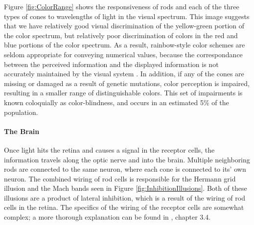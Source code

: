 \documentclass[11pt]{isuthesis}
\begin{document}
Figure \ref{fig:ColorRange} shows the responsiveness of rods and each of the three types of cones to wavelengths of light in the visual spectrum. This image suggests that we have relatively good visual discrimination of the yellow-green portion of the color spectrum, but relatively poor discrimination of colors in the red and blue portions of the color spectrum. As a result, rainbow-style color schemes are seldom appropriate for conveying numerical values, because the correspondance between the perceived information and the displayed information is not accurately maintained by the visual system \citep{rainbowcolor}. In addition, if any of the cones are missing or damaged as a result of genetic mutations, color perception is impaired, resulting in a smaller range of distinguishable colors. This set of impairments is known coloquially as color-blindness, and occurs in an estimated 5\% of the population. 

\paragraph{The Brain}
Once light hits the retina and causes a signal in the receptor cells, the information travels along the optic nerve and into the brain. Multiple neighboring rods are connected to the same neuron, where each cone is connected to its' own neuron. The combined wiring of rod cells is responsible for the Hermann grid illusion and the Mach bands seen in Figure \ref{fig:InhibitionIllusions}. Both of these illusions are a product of lateral inhibition, which is a result of the wiring of rod cells in the retina.  The specifics of the wiring of the receptor cells are somewhat complex; a more thorough explanation can be found in \citet{goldstein}, chapter 3.4. 
\end{document}
